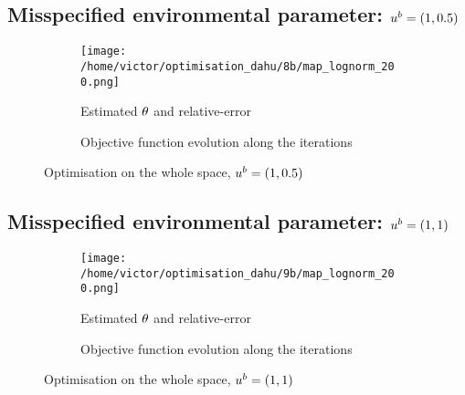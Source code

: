 \documentclass[../../Main_ManuscritThese.tex]{subfiles}
\begin{document}
\subsection*{Misspecified environmental parameter: $u^b=(1, 0.5)$}
\begin{figure}[ht]
  \begin{subfigure}{\textwidth}
  \centering
  \texttt{[image: /home/victor/optimisation\_dahu/8b/map\_lognorm\_200.png]}
  \caption{Estimated $\theta$ and relative-error}
\end{subfigure}
\begin{subfigure}{\textwidth}
  \centering
  \resizebox{1\textwidth}{!}{}
    \caption{Objective function evolution along the iterations}
  \end{subfigure}
  \caption{Optimisation on the whole space, $u^b=(1, 0.5)$}
\end{figure}
\clearpage
\subsection*{Misspecified environmental parameter: $u^b=(1, 1)$}
\begin{figure}[ht]
  \begin{subfigure}{\textwidth}
  \centering
  \texttt{[image: /home/victor/optimisation\_dahu/9b/map\_lognorm\_200.png]}
  \caption{Estimated $\theta$ and relative-error}
\end{subfigure}
\begin{subfigure}{\textwidth}
  \centering
  \resizebox{1\textwidth}{!}{}
    \caption{Objective function evolution along the iterations}
\end{subfigure}
\caption{Optimisation on the whole space, $u^b=(1, 1)$}
\end{figure}

\markchapterend


\pagestyle{appendixStyle}



\subfileLocal{
	\pagestyle{empty}
	
	

}

\endgroup
\end{document}
